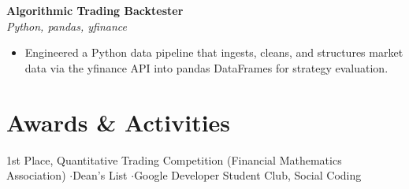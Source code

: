 \documentclass[letterpaper,10.5pt]{article}
\newcommand{\entry}[4]{\textbf{#1}\hfill{\small #2}\\\textit{\small #3}\hfill{\small #4}\par\vspace{1pt}}
\begin{document}
\entry{Algorithmic Trading Backtester}{}{Python, pandas, yfinance}{}
\begin{itemize}
  \item Engineered a Python data pipeline that ingests, cleans, and structures market data via the yfinance API into pandas DataFrames for strategy evaluation.
\end{itemize}

\section{Awards \& Activities}
{\small 1st Place, Quantitative Trading Competition (Financial Mathematics Association) \quad$\cdot$\quad Dean's List \quad$\cdot$\quad Google Developer Student Club, Social Coding}
\end{document}
